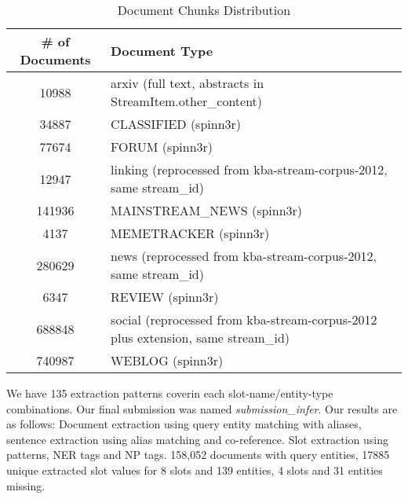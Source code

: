  
\begin{table*}
\caption{Document Chunks Distribution }
\centering
\label{table:documentsDist}

\begin{tabular}{|c|l|}
\hline 
\textbf{\# of Documents} & \textbf{Document Type}\\ 
\hline 
10988 & 	arxiv (full text, abstracts in StreamItem.other\_content) \\ \hline
34887 & CLASSIFIED (spinn3r)  \\ \hline
77674 & FORUM (spinn3r)  \\ \hline
12947 & linking (reprocessed from kba-stream-corpus-2012, same stream\_id)  \\ \hline
141936 & MAINSTREAM\_NEWS (spinn3r)  \\ \hline
4137 & MEMETRACKER (spinn3r)  \\ \hline
280629 & news (reprocessed from kba-stream-corpus-2012, same stream\_id)  \\ \hline
6347 &  REVIEW (spinn3r) \\ \hline
688848 & 	 social (reprocessed from kba-stream-corpus-2012 plus extension, same stream\_id)  \\ \hline
740987 & WEBLOG (spinn3r)  \\ \hline

  
\hline 
\end{tabular} 
\end{table*}


 
 
 
We have 135 extraction patterns coverin each slot-name/entity-type combinations. Our final submission was named \textit{submission\_infer}. Our results are as follows: Document extraction using query entity matching with aliases, sentence 
extraction using alias matching and co-reference. Slot extraction using 
patterns, NER tags and NP tags. 158,052 documents with query entities, 17885 
unique extracted slot values for 8 slots and 139 entities, 4 slots and 31 
entities missing.

